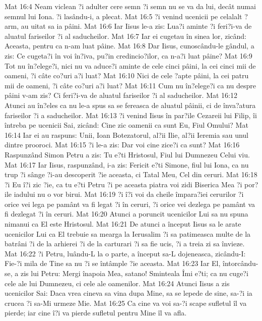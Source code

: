 Mat 16:4  Neam viclean ?i adulter cere semn ?i semn nu se va da lui, decât numai semnul lui Iona. ?i lasându-i, a plecat.
Mat 16:5  ?i venind ucenicii pe celalalt ?arm, au uitat sa ia pâini.
Mat 16:6  Iar Iisus le-a zis: Lua?i aminte ?i feri?i-va de aluatul fariseilor ?i al saducheilor.
Mat 16:7  Iar ei cugetau în sinea lor, zicând: Aceasta, pentru ca n-am luat pâine.
Mat 16:8  Dar Iisus, cunoscându-le gândul, a zis: Ce cugeta?i în voi în?iva, pu?in credincio?ilor, ca n-a?i luat pâine?
Mat 16:9  Tot nu în?elege?i, nici nu va aduce?i aminte de cele cinci pâini, la cei cinci mii de oameni, ?i câte co?uri a?i luat?
Mat 16:10  Nici de cele ?apte pâini, la cei patru mii de oameni, ?i câte co?uri a?i luat?
Mat 16:11  Cum nu în?elege?i ca nu despre pâini v-am zis? Ci feri?i-va de aluatul fariseilor ?i al saducheilor.
Mat 16:12  Atunci au în?eles ca nu le-a spus sa se fereasca de aluatul pâinii, ci de înva?atura fariseilor ?i a saducheilor.
Mat 16:13  ?i venind Iisus în par?ile Cezareii lui Filip, îi întreba pe ucenicii Sai, zicând: Cine zic oamenii ca sunt Eu, Fiul Omului?
Mat 16:14  Iar ei au raspuns: Unii, Ioan Botezatorul, al?ii Ilie, al?ii Ieremia sau unul dintre prooroci.
Mat 16:15  ?i le-a zis: Dar voi cine zice?i ca sunt?
Mat 16:16  Raspunzând Simon Petru a zis: Tu e?ti Hristosul, Fiul lui Dumnezeu Celui viu.
Mat 16:17  Iar Iisus, raspunzând, i-a zis: Fericit e?ti Simone, fiul lui Iona, ca nu trup ?i sânge ?i-au descoperit ?ie aceasta, ci Tatal Meu, Cel din ceruri.
Mat 16:18  ?i Eu î?i zic ?ie, ca tu e?ti Petru ?i pe aceasta piatra voi zidi Biserica Mea ?i por?ile iadului nu o vor birui.
Mat 16:19  ?i î?i voi da cheile împara?iei cerurilor ?i orice vei lega pe pamânt va fi legat ?i în ceruri, ?i orice vei dezlega pe pamânt va fi dezlegat ?i în ceruri.
Mat 16:20  Atunci a poruncit ucenicilor Lui sa nu spuna nimanui ca El este Hristosul.
Mat 16:21  De atunci a început Iisus sa le arate ucenicilor Lui ca El trebuie sa mearga la Ierusalim ?i sa patimeasca multe de la batrâni ?i de la arhierei ?i de la carturari ?i sa fie ucis, ?i a treia zi sa învieze.
Mat 16:22  ?i Petru, luându-L la o parte, a început sa-L dojeneasca, zicându-I: Fie-?i mila de Tine sa nu ?i se întâmple ?ie aceasta.
Mat 16:23  Iar El, întorcându-se, a zis lui Petru: Mergi înapoia Mea, satano! Sminteala Îmi e?ti; ca nu cuge?i cele ale lui Dumnezeu, ci cele ale oamenilor.
Mat 16:24  Atunci Iisus a zis ucenicilor Sai: Daca vrea cineva sa vina dupa Mine, sa se lepede de sine, sa-?i ia crucea ?i sa-Mi urmeze Mie.
Mat 16:25  Ca cine va voi sa-?i scape sufletul îl va pierde; iar cine î?i va pierde sufletul pentru Mine îl va afla.
